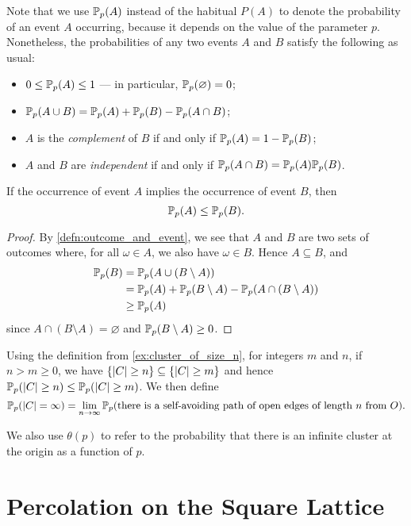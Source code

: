 \documentclass[a4paper, 12pt]{article}
\begin{document}
Note that we use $\P(A)$ instead of the habitual $P(A)$ to denote the probability of an event $A$ occurring, because it depends on the value of the parameter $p$. Nonetheless, the probabilities of any two events $A$ and $B$ satisfy the following as usual:
\begin{itemize}
    \item $0 \leq \P(A) \leq 1$ --- in particular, $\P(\varnothing) = 0$;
    \item $\P(A \cup B) = \P(A) + \P(B) - \P(A \cap B)$;
    \item $A$ is the \textit{complement} of $B$ if and only if $\P(A) = 1 - \P(B)$;
    \item $A$ and $B$ are \textit{independent} if and only if $\P(A \cap B) = \P(A) \P(B)$.
\end{itemize}

\begin{lem}[Monotonicity]\label{lem:event_subseteq}
If the occurrence of event $A$ implies the occurrence of event $B$, then $$\P(A) \leq \P(B).$$
\end{lem}
\begin{proof}
By \cref{defn:outcome_and_event}, we see that $A$ and $B$ are two sets of outcomes where, for all $\omega \in A$, we also have $\omega \in B$. Hence $A \subseteq B$, and 
\begin{align*}
    \P(B) 
    &= \P(A \cup (B \setminus A))\\
    &= \P(A) + \P(B \setminus A) - \P(A \cap (B \setminus A))\\
    &\geq \P(A)
\end{align*}
since $A \cap (B \setminus A) = \varnothing$ and $\P(B \setminus A) \geq 0$.
\end{proof}

\begin{cor}\label{cor:inf_cluster}
Using the definition from \cref{ex:cluster_of_size_n}, for integers $m$ and $n$, if $n > m \geq 0$, we have $\{\abs{C} \geq n\} \subseteq \{\abs{C} \geq m\}$ and hence $\P(\abs{C} \geq n) \leq \P(\abs{C} \geq m)$. We then define
\[
\P(\abs{C} = \infty) 
= \lim_{n \to \infty} \P(\text{there is a self-avoiding path of open edges of length } n \text{ from } O).
\]
\end{cor}
We also use $\theta(p)$ to refer to the probability that there is an infinite cluster at the origin as a function of $p$.

\section{Percolation on the Square Lattice}\label{sec:Z2}
\end{document}

